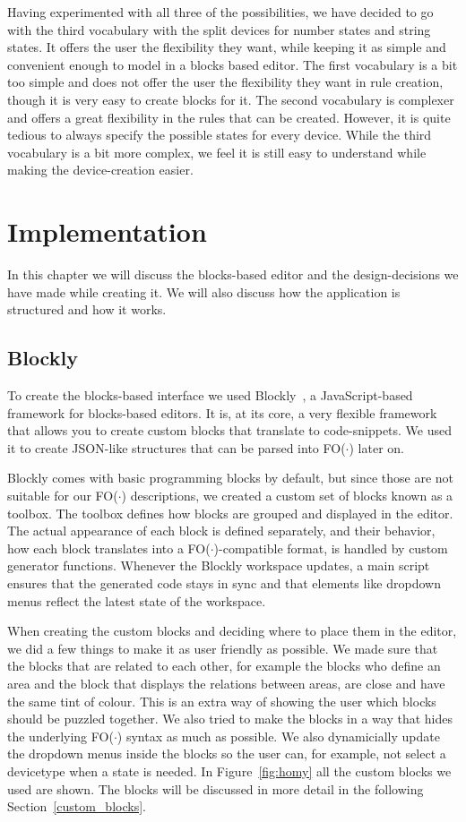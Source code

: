 \documentclass[11pt,a4paper]{report}
\newcommand{\fodot}{FO($\cdot$)\xspace}
\begin{document}
Having experimented with all three of the possibilities, we have decided to go with the third vocabulary with the split devices for number states and string states. It offers the user the flexibility they want, while keeping it as simple and convenient enough to model in a blocks based editor. The first vocabulary is a bit too simple and does not offer the user the flexibility they want in rule creation, though it is very easy to create blocks for it. The second vocabulary is complexer and offers a great flexibility in the rules that can be created. However, it is quite tedious to always specify the possible states for every device. While the third vocabulary is a bit more complex, we feel it is still easy to understand while making the device-creation easier.

\chapter{Implementation}
In this chapter we will discuss the blocks-based editor and the design-decisions we have made while creating it. We will also discuss how the application is structured and how it works.

\section{Blockly}

To create the blocks-based interface we used Blockly~\cite{Blockly}, a JavaScript-based framework for blocks-based editors. It is, at its core, a very flexible framework that allows you to create custom blocks that translate to code-snippets. We used it to create JSON-like structures that can be parsed into \fodot later on.

Blockly comes with basic programming blocks by default, but since those are not suitable for our \fodot descriptions, we created a custom set of blocks known as a toolbox. The toolbox defines how blocks are grouped and displayed in the editor. The actual appearance of each block is defined separately, and their behavior, how each block translates into a \fodot-compatible format, is handled by custom generator functions. Whenever the Blockly workspace updates, a main script ensures that the generated code stays in sync and that elements like dropdown menus reflect the latest state of the workspace.

When creating the custom blocks and deciding where to place them in the editor, we did a few things to make it as user friendly as possible. We made sure that the blocks that are related to each other, for example the blocks who define an area and the block that displays the relations between areas, are close and have the same tint of colour. This is an extra way of showing the user which blocks should be puzzled together. We also tried to make the blocks in a way that hides the underlying \fodot syntax as much as possible. We also dynamicially update the dropdown menus inside the blocks so the user can, for example, not select a devicetype when a state is needed. In Figure~\ref{fig:homy} all the custom blocks we used are shown. The blocks will be discussed in more detail in the following Section~\ref{custom_blocks}.
\end{document}
